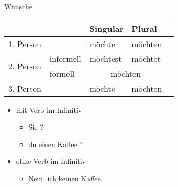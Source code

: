 \begin{semantics}{Wünsche}{}
\begin{tabular}{|l|l|l|l|l}
	\hline
	\multicolumn{2}{|l|}{} & Singular & Plural \\
	\hline
	\multicolumn{2}{|l|}{1. Person} & möchte & möchten \\
	\hline
	\multirow{2}{*}{2. Person} & informell & möchtest & möchtet \\
	\cline{2-4}
							   & formell & \multicolumn{2}{c|}{möchten} \\
	\hline
	\multicolumn{2}{|l|}{3. Person} & möchte & möchten \\
	\hline
\end{tabular}

\begin{itemize}
	\item {} mit Verb im Infinitiv \begin{itemize}
			\item {} Sie ?
			\item {} du einen Kaffee ?
		\end{itemize}
	\item {} ohne Verb im Infinitiv \begin{itemize}
			\item Nein, ich  keinen Kaffee.
		\end{itemize}
\end{itemize}
\end{semantics}
